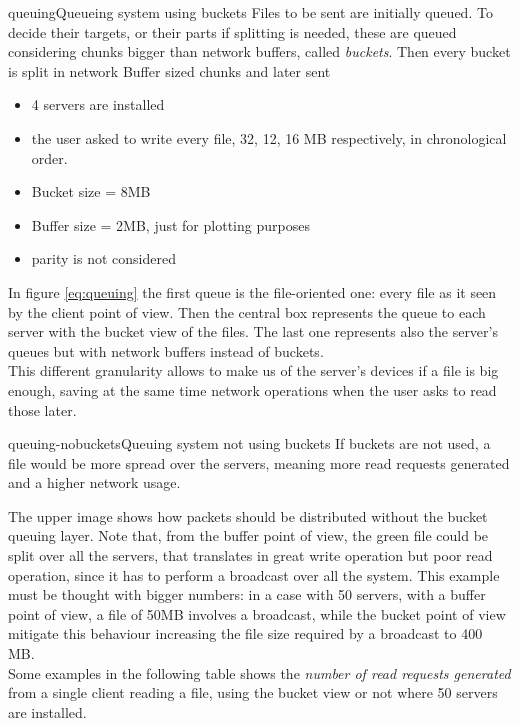 \begin{myimage}{queuing}{Queueing system using buckets}
    Files to be sent are initially queued. To decide their targets, or
    their parts if splitting is needed, these are queued considering
    chunks bigger than network buffers, called \textit{buckets}. Then every
    bucket is split in network Buffer sized chunks and later sent
\end{myimage}
\begin{itemize}
    \item 4 servers are installed
    \item the user asked to write every file, 32, 12, 16 MB respectively, in
        chronological order.
    \item Bucket size = 8MB
    \item Buffer size = 2MB, just for plotting purposes
    \item parity is not considered
\end{itemize}
In figure \ref{eq:queuing} the first queue is the file-oriented one: every file as it seen
by the client point of view.  Then the central box represents the queue to each
server with the bucket view of the files.  The last one represents also the
server's queues but with network buffers instead of buckets. \\ This different
granularity allows to make us of the server's devices if a file is big enough,
saving at the same time network operations when the user asks to read those
later.\\
\begin{myimage}{queuing-nobuckets}{Queuing system not using buckets}
    If buckets are not used, a file would be more spread over the servers,
    meaning more read requests generated and a higher network usage.
\end{myimage}
The upper image shows how packets should be distributed without the bucket queuing layer.
Note that, from the buffer point of view, the green file could be
split over all the servers, that translates in great write operation but poor
read operation, since it has to perform a broadcast over all the system. This
example must be thought with bigger numbers: in a case with 50 servers, with a
buffer point of view, a file of 50MB involves a broadcast, while the bucket
point of view mitigate this behaviour increasing the file size required by a
broadcast to 400 MB. \\
Some examples in the following table shows the \textit{number of read requests generated}
from a single client reading a file, using the bucket view or not where 50 servers are installed.

